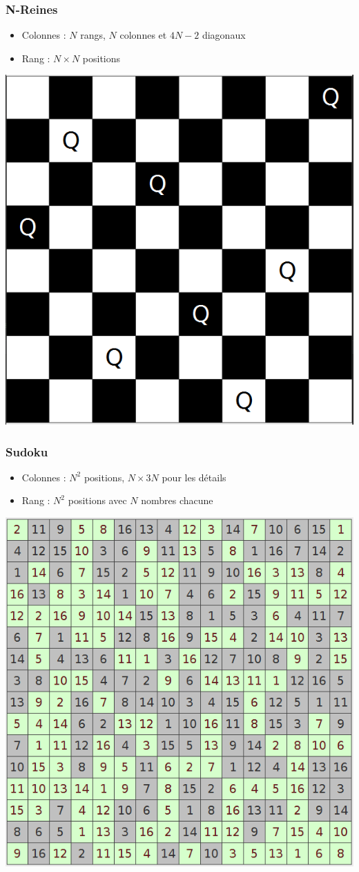 \documentclass[12pt,t]{beamer}
\begin{document}
\begin{frame}
\frametitle{N-Reines}
\begin{itemize}
  \item Colonnes : $N$ rangs, $N$ colonnes et $4N - 2$ diagonaux
  \item Rang : $N \times N$ positions
\end{itemize}
\begin{center}
\includegraphics[width=.5\textwidth]{queens.png}
\label{fig:queens}
\end{center}
\end{frame}

\begin{frame}
\frametitle{Sudoku}
\begin{itemize}
  \item Colonnes : $N^2$ positions, $N \times 3N$ pour les détails
  \item Rang : $N^2$ positions avec $N$ nombres chacune
\end{itemize}
\begin{center}
\includegraphics[width=.5\textwidth]{sudoku.png}
\label{fig:sudoku}
\end{center}
\end{frame}
\end{document}
